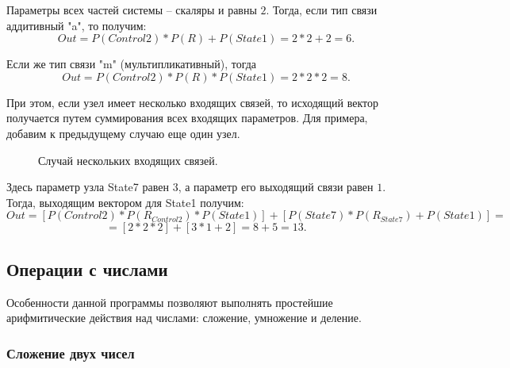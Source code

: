 \documentclass{article}
\numberwithin{equation}{section}
\begin{document}
	
Параметры всех частей системы -- скаляры и равны $2$. 	Тогда, если тип связи аддитивный "a", то получим:
$$
Out = P(Control2) * P(R) + P(State1) = 2 * 2 + 2 = 6.
$$
 
 \begin{figure}[h]
\label{ris:image4}
\end{figure}
	
Если же тип связи "m" (мультипликативный), тогда
$$
Out = P(Control2) * P(R) * P(State1) = 2 * 2 * 2 = 8.
$$ 
 \begin{figure}[h]
\label{ris:image5}
\end{figure}	


\newpage
При этом, если узел имеет несколько входящих связей, то исходящий вектор получается путем суммирования всех входящих параметров. Для примера, добавим к предыдущему случаю еще один узел.

\begin{figure}[h]
\caption{Случай нескольких входящих связей.}
\label{ris:image6}
\end{figure}


Здесь параметр узла State7 равен $3$, а параметр его выходящий связи равен $1$. Тогда, выходящим вектором для State1 получим: 
$$
Out = \left[ P(Control2) * P(R_{Control2}) * P(State1)\right] + \left[P(State7) * P(R_{State7}) + P(State1)\right]=$$ $$  = [2 * 2 * 2] + [3 *1 + 2] = 8 + 5 = 13.
$$ 

\begin{figure}[h]
\label{ris:image7}
\end{figure}


\qquad 

\newpage
\subsection{Операции с числами}


\qquad Особенности данной программы позволяют выполнять простейшие арифмитические действия над числами: сложение, умножение и деление.

\subsubsection{Сложение двух чисел}
\end{document}
